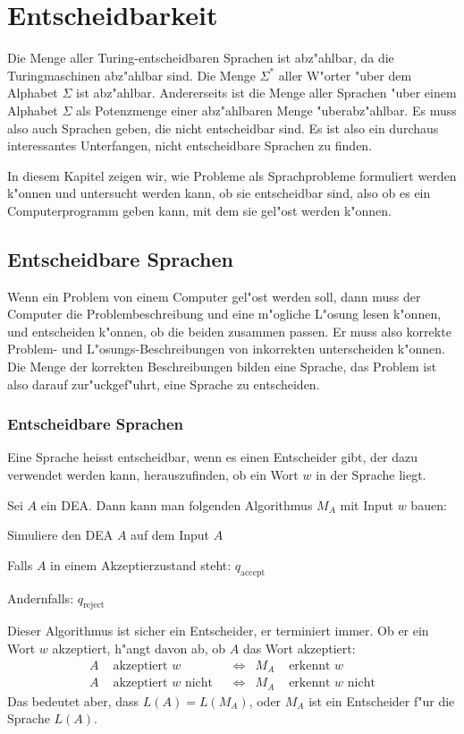 % 
%
\chapter{Entscheidbarkeit\label{chapter-entscheidbarkeit}}
\rhead{}
Die Menge aller Turing-entscheidbaren Sprachen ist abz"ahlbar,
da die Turingmaschinen abz"ahlbar sind.
Die Menge $\Sigma^*$ aller W"orter "uber dem Alphabet $\Sigma$ ist abz"ahlbar.
Andererseits ist die Menge aller Sprachen "uber einem Alphabet $\Sigma$
als Potenzmenge einer abz"ahlbaren Menge "uberabz"ahlbar. Es muss
also auch Sprachen geben, die nicht entscheidbar sind. Es ist also
ein durchaus interessantes Unterfangen, nicht entscheidbare Sprachen
zu finden.

In diesem Kapitel zeigen wir, wie Probleme als Sprachprobleme
formuliert werden k"onnen und untersucht werden kann, ob sie entscheidbar sind,
also ob es ein Computerprogramm geben kann, mit dem sie gel"ost werden
k"onnen.

\section{Entscheidbare Sprachen}
Wenn ein Problem von einem Computer gel"ost werden soll, dann
muss der Computer die Problembeschreibung und eine m"ogliche L"osung
lesen k"onnen, und entscheiden k"onnen, ob die beiden zusammen passen.
Er muss also korrekte Problem- und L"osungs-Beschreibungen von
inkorrekten unterscheiden k"onnen. Die Menge der korrekten
Beschreibungen bilden eine Sprache, das Problem ist also darauf
zur"uckgef"uhrt, eine Sprache zu entscheiden.

\subsection{Entscheidbare Sprachen}
Eine Sprache heisst entscheidbar, wenn es einen Entscheider gibt, der
dazu verwendet werden kann, herauszufinden, ob ein Wort $w$ in der Sprache
liegt. 

\begin{beispiel}
Sei $A$ ein DEA. Dann kann man folgenden Algorithmus $M_A$ mit Input $w$ bauen:
\begin{compactenum}
\item Simuliere den DEA $A$ auf dem Input $A$
\item Falls $A$ in einem Akzeptierzustand steht: $q_{\text{accept}}$
\item Andernfalls: $q_{\text{reject}}$
\end{compactenum}
Dieser Algorithmus ist sicher ein Entscheider, er terminiert immer.
Ob er ein Wort $w$ akzeptiert, h"angt davon ab, ob $A$ das Wort akzeptiert:
\begin{align*}
  A&\text{ akzeptiert $w$}&
   &\Leftrightarrow&
M_A&\text{ erkennt $w$}
\\
  A&\text{ akzeptiert $w$ nicht}&
   &\Leftrightarrow&
M_A&\text{ erkennt $w$ nicht}
\end{align*}
Das bedeutet aber, dass $L(A)=L(M_A)$, oder $M_A$ ist ein Entscheider f"ur
die Sprache $L(A)$.
\end{beispiel}


